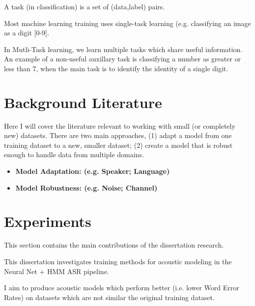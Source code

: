 \documentclass[10pt,a4paper]{article}
\begin{document}
A task (in classification) is a set of (data,label) pairs.

Most machine learning training uses single-task learning (e.g. classifying an image as a digit [0-9].

In Mutli-Task learning, we learn multiple tasks which share useful information. An example of a non-useful auxillary task is classifying a number as greater or less than 7, when the main task is to identify the identity of a single digit.






\newpage

\section{Background Literature}

Here I will cover the literature relevant to working with small (or completely new) datasets. There are two main approaches, (1) adapt a model from one training dataset to a new, smaller dataset; (2) create a model that is robust enough to handle data from multiple domains. 

\begin{itemize}

\item \textbf{Model Adaptation: (e.g. Speaker; Language)}

    
  
\item \textbf{Model Robustness: (e.g. Noise; Channel)}

  
\end{itemize}



\newpage

\section{Experiments}

This section contains the main contributions of the dissertation research.

This dissertation investigates training methods for acoustic modeling in the Neural Net + HMM ASR pipeline.

I aim to produce acoustic models which perform better (i.e. lower Word Error Rates) on datasets which are not similar the original training dataset.
\end{document}
